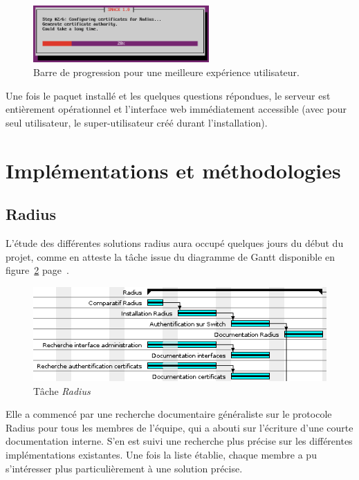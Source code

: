 \begin{figure}[!h]
	\begin{center}
	    \includegraphics[width=0.6\textwidth]{img/install_progress.png}
	\end{center}
	\caption{Barre de progression pour une meilleure expérience utilisateur.}
	\label{install_progress}
\end{figure}

Une fois le paquet installé et les quelques questions répondues, le serveur est entièrement opérationnel et l'interface web immédiatement accessible (avec pour seul utilisateur, le super-utilisateur créé durant l'installation).

\section{Implémentations et méthodologies}
\subsection{Radius}

L'étude des différentes solutions radius aura occupé quelques jours du début du projet, comme en atteste la tâche issue du diagramme de Gantt disponible en figure~\ref{gantt_radius} page~\pageref{gantt_radius}.

\begin{figure}[!h]
	\begin{center}
		\includegraphics[width=350pt]{img/gantt_radius.png}
	\end{center}
	\caption{Tâche \textit{Radius}}
	\label{gantt_radius}
\end{figure}

Elle a commencé par une recherche documentaire généraliste sur le protocole Radius pour tous les membres de l'équipe, qui a abouti sur l'écriture d'une courte documentation interne. S'en est suivi une recherche plus précise sur les différentes implémentations existantes. Une fois la liste établie, chaque membre a pu s'intéresser plus particulièrement à une solution précise.

